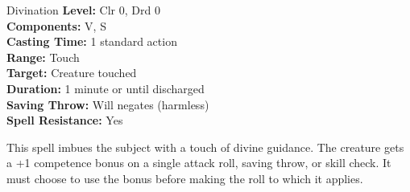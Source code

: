 {Divination}
{
	\textbf{Level:}
	Clr 0, Drd 0\\
	\textbf{Components:}
	V, S\\
	\textbf{Casting Time:}
	1 standard action\\
	\textbf{Range:}
	Touch\\
	\textbf{Target:}
	Creature touched\\
	\textbf{Duration:}
	1 minute or until discharged\\
	\textbf{Saving Throw:}
	Will negates (harmless)\\
	\textbf{Spell Resistance:}
	Yes\\
}
{
	This spell imbues the subject with a touch of divine guidance. The creature gets a +1 competence bonus on a single attack roll, saving throw, or skill check. It must choose to use the bonus before making the roll to which it applies.

}
